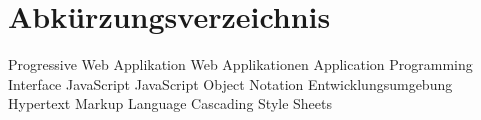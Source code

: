 \chapter*{Abkürzungsverzeichnis}
\pagestyle{plain}

\begin{acronym}[AUTOSAR]

   				{Progressive Web Applikation}
 			{Web Applikationen}
  				{Application Programming Interface}
  				{JavaScript}
  				{JavaScript Object Notation}
  				{Entwicklungsumgebung}
 				{Hypertext Markup Language}
 				{Cascading Style Sheets}
\end{acronym}